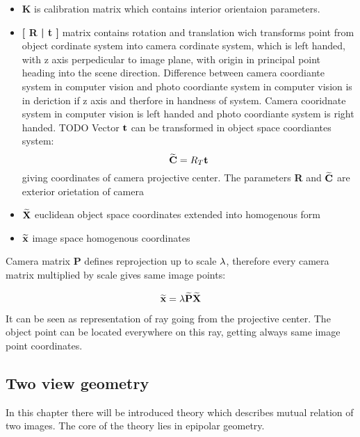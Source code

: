\documentclass[a4paper,12pt]{report}
\newcommand{\ematr}[1]{
{\bf #1}
}
\newcommand{\evect}[1]{
{\bf #1}
}
\newcommand{\ehvect}[1]{
{\bf \widetilde{#1}}
}
\newcommand{\escal}[1]{
{\it #1}
}
\begin{document}
\begin{itemize}
\item \ematr{K} is calibration matrix which contains interior orientaion parameters.  

\item \ematr{[\ematr{R}|\evect{t}]} matrix contains rotation and translation wich transforms point from object cordinate system 
	      into camera cordinate system, which is left handed, with z axis perpedicular to image plane, with
	      origin in principal point heading into the scene direction. Difference between camera coordiante 
	      system in computer vision and photo coordiante system in computer vision is in deriction 
	      if z axis and therfore in handness of system. Camera cooridnate system in computer vision 
	      is left handed and photo coordiante system is right handed. TODO 
	      Vector $\evect{t}$ can  be transformed in object space coordiantes system:
	      \begin{equation}
	      \ehvect{C} = R_{T}\evect{t}
	      \end{equation}
	      giving coordinates of camera projective center. The parameters \ematr{R} and $\ehvect{C}$
	      are exterior orietation of camera
	      
\item $\ehvect{X}$ euclidean object space coordinates extended into homogenous form

\item $\ehvect{x}$ image space homogenous coordinates
\end{itemize}

Camera matrix \ematr{P} defines reprojection up to scale $\escal{\lambda}$, therefore every camera matrix multiplied by scale gives same image points:

\begin{equation}
\ehvect{x}=\lambda\ehvect{P}\ehvect{X}
 \end{equation}

It can be seen as representation of ray going from the projective center. The object point can be located everywhere on this ray, getting always 
same image point coordinates.

\subsection{Two view geometry}

In this chapter there will be introduced theory which describes mutual relation of two images. 
The core of the theory lies in epipolar geometry.
\end{document}
